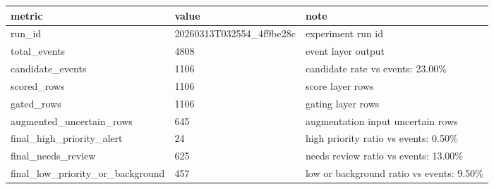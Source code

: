 ﻿\begin{tabular}{|l|l|l|}
\hline
metric & value & note \\
\hline
run\_id & 20260313T032554\_4f9be28c & experiment run id \\
\hline
total\_events & 4808 & event layer output \\
\hline
candidate\_events & 1106 & candidate rate vs events: 23.00\% \\
\hline
scored\_rows & 1106 & score layer rows \\
\hline
gated\_rows & 1106 & gating layer rows \\
\hline
augmented\_uncertain\_rows & 645 & augmentation input uncertain rows \\
\hline
final\_high\_priority\_alert & 24 & high priority ratio vs events: 0.50\% \\
\hline
final\_needs\_review & 625 & needs review ratio vs events: 13.00\% \\
\hline
final\_low\_priority\_or\_background & 457 & low or background ratio vs events: 9.50\% \\
\hline
\end{tabular}
